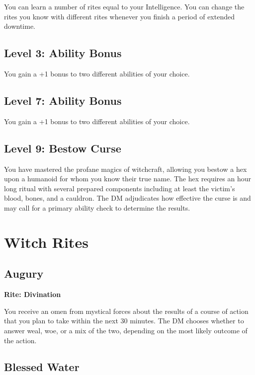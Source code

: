 \documentclass[12pt,letterpaper,twocolumn,openany,nodeprecatedcode,bg=none]{dndbook}
\let\oldsubsection\subsection
\renewcommand{\subsection}[1]{%
  \needspace{5\baselineskip}%
  \oldsubsection{#1}%
}
\begin{document}
You can learn a number of rites equal to your Intelligence. You can
change the rites you know with different rites whenever you finish a
period of extended downtime.

\subsection{Level 3: Ability Bonus}\label{level-3-ability-bonus}

You gain a +1 bonus to two different abilities of your choice.

\subsection{Level 7: Ability Bonus}\label{level-7-ability-bonus}

You gain a +1 bonus to two different abilities of your choice.

\subsection{Level 9: Bestow Curse}\label{level-9-bestow-curse}

You have mastered the profane magics of witchcraft, allowing you bestow
a hex upon a humanoid for whom you know their true name. The hex
requires an hour long ritual with several prepared components including
at least the victim's blood, bones, and a cauldron. The DM adjudicates
how effective the curse is and may call for a primary ability check to
determine the results.

\clearpage

\section{Witch Rites}\label{witch-rites}

\subsection{Augury}\label{augury}

\textbf{Rite: Divination}

You receive an omen from mystical forces about the results of a course
of action that you plan to take within the next 30 minutes. The DM
chooses whether to answer weal, woe, or a mix of the two, depending on
the most likely outcome of the action.

\subsection{Blessed Water}\label{blessed-water}
\end{document}
